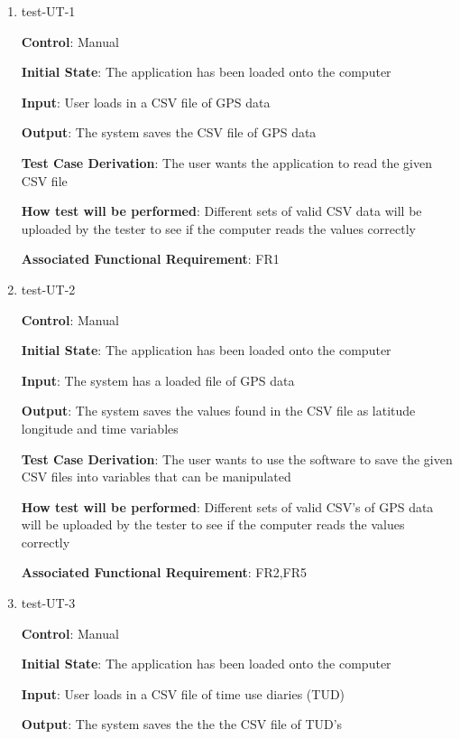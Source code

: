 \documentclass[12pt, titlepage]{article}
\begin{document}
\begin{enumerate}

\item{test-UT-1\\}

\textbf{Control}: Manual 
					
\textbf{Initial State}: The application has been loaded onto the computer
					
\textbf{Input}: User loads in a CSV file of GPS data
				
\textbf{Output}: The system saves the CSV file of GPS data

\textbf{Test Case Derivation}: The user wants the application to read the given CSV file 
					
\textbf{How test will be performed}: Different sets of valid CSV data will be uploaded by the tester to see if the computer reads the values correctly

\textbf{Associated Functional Requirement}: FR1 

\item{test-UT-2\\}

\textbf{Control}: Manual 
					
\textbf{Initial State}: The application has been loaded onto the computer
					
\textbf{Input}: The system has a loaded file of GPS data 
					
\textbf{Output}: The system saves the values found in the CSV file as latitude longitude and time variables

\textbf{Test Case Derivation}: The user wants to use the software to save the given CSV files into variables that can be manipulated
					
\textbf{How test will be performed}: Different sets of valid CSV's of GPS data will be uploaded by the tester to see if the computer reads the values correctly

\textbf{Associated Functional Requirement}: FR2,FR5

\item{test-UT-3\\}

\textbf{Control}: Manual 
					
\textbf{Initial State}: The application has been loaded onto the computer
					
\textbf{Input}: User loads in a CSV file of time use diaries (TUD)
					
\textbf{Output}: The system saves the the the CSV file of TUD's


\end{enumerate}
\end{document}
